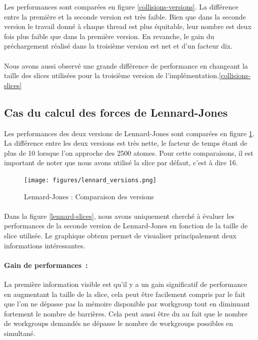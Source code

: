 \documentclass{article}
\begin{document}
Les performances sont comparées en figure \ref{collisions-versions}. La différence entre la première et la seconde version est très faible. Bien
que dans la seconde version le travail donné à chaque thread est plus
équitable, leur nombre est deux fois plus faible que dans la première version.
En revanche, le gain du préchargement réalisé dans la troisième version est
net et d'un facteur dix.
\paragraph{}
Nous avons aussi observé une grande différence de performance en
changeant la taille des slices utilisées pour la troisième version
de l'implémentation.\ref{collisions-slices}%

\subsection{Cas du calcul des forces de Lennard-Jones}

Les performances des deux versions de Lennard-Jones sont comparées en figure
\ref{lennard-versions}. La différence entre les deux versions est très nette,
le facteur de temps étant de plus de 10 lorsque l'on approche des 2500 atomes.
Pour cette comparaisons, il est important de noter que nous avons utilisé la
slice par défaut, c'est à dire 16.
\begin{figure}[htb]
	\caption{Lennard-Jones : Comparaison des versions}
	\label{lennard-versions}
	\texttt{[image: figures/lennard\_versions.png]}
\end{figure}
\paragraph{}
Dans la figure \ref{lennard-slices}, nous avons uniquement cherché à évaluer les
performances de la seconde version de Lennard-Jones en fonction de la taille de
slice utilisée. Le graphique obtenu permet de visualiser principalement deux
informations intéressantes.
\paragraph{Gain de performances~:}
La première information visible est qu'il y a un gain significatif de
performance en augmentant la taille de la slice, cela peut être facilement
compris par le fait que l'on ne dépasse pas la mémoire disponible par workgroup
tout en diminuant fortement le nombre de barrières. Cela peut aussi être du au
fait que le nombre de workgroups demandés ne dépasse le nombre de workgroups
possibles en simultané.
\end{document}
